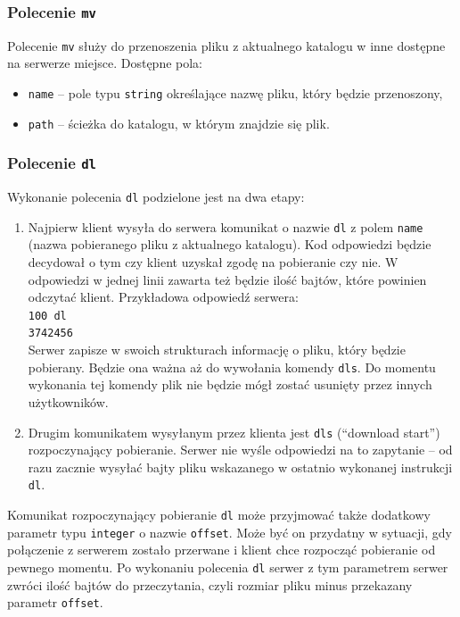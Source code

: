 \documentclass[8pt,a4paper]{article}
\newcommand{\quotes}[1]{``#1''}
\begin{document}
\subsubsection{Polecenie \texttt{mv}}
Polecenie \texttt{mv} służy do przenoszenia pliku z aktualnego katalogu w inne dostępne na serwerze miejsce. Dostępne pola:
\begin{itemize}
    \item \texttt{name} -- pole typu \texttt{string} określające nazwę pliku, który będzie przenoszony,
    \item \texttt{path} -- ścieżka do katalogu, w którym znajdzie się plik.
\end{itemize}

\subsubsection{Polecenie \texttt{dl}}
\noindent Wykonanie polecenia \texttt{dl} podzielone jest na dwa etapy:
\begin{enumerate}
    \item Najpierw klient wysyła do serwera komunikat o nazwie \texttt{dl} z polem \texttt{name} (nazwa pobieranego pliku z aktualnego katalogu). Kod odpowiedzi będzie decydował o tym czy klient uzyskał zgodę na pobieranie czy nie. W odpowiedzi w jednej linii zawarta też będzie ilość bajtów, które powinien odczytać klient. Przykładowa odpowiedź serwera:\\
    \texttt{100 dl}\\
    \texttt{3742456}\\
    Serwer zapisze w swoich strukturach informację o pliku, który będzie pobierany. Będzie ona ważna aż do wywołania komendy \texttt{dls}. Do momentu wykonania tej komendy plik nie będzie mógł zostać usunięty przez innych użytkowników.
    \item Drugim komunikatem wysyłanym przez klienta jest \texttt{dls} (\quotes{download start}) rozpoczynający pobieranie. Serwer nie wyśle odpowiedzi na to zapytanie -- od razu zacznie wysyłać bajty pliku wskazanego w ostatnio wykonanej instrukcji \texttt{dl}.
\end{enumerate}

Komunikat rozpoczynający pobieranie \texttt{dl} może przyjmować także dodatkowy parametr typu \texttt{integer} o nazwie \texttt{offset}. Może być on przydatny w sytuacji, gdy połączenie z serwerem zostało przerwane i klient chce rozpocząć pobieranie od pewnego momentu. Po wykonaniu polecenia \texttt{dl} serwer z tym parametrem serwer zwróci ilość bajtów do przeczytania, czyli rozmiar pliku minus przekazany parametr \texttt{offset}.
\end{document}
